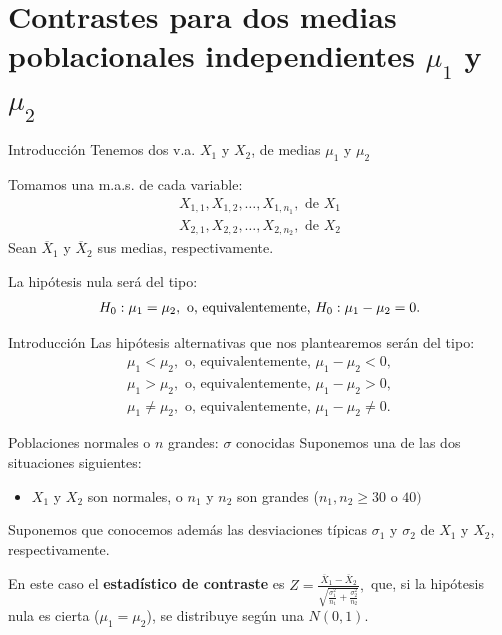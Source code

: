 \documentclass[
  ignorenonframetext,
]{beamer}
\providecommand{\tightlist}{%
  \setlength{\itemsep}{0pt}\setlength{\parskip}{0pt}}
\begin{document}
\hypertarget{contrastes-para-dos-medias-poblacionales-independientes-mu_1-y-mu_2}{%
\section{\texorpdfstring{Contrastes para dos medias poblacionales
independientes \(\mu_1\) y
\(\mu_2\)}{Contrastes para dos medias poblacionales independientes \textbackslash mu\_1 y \textbackslash mu\_2}}\label{contrastes-para-dos-medias-poblacionales-independientes-mu_1-y-mu_2}}

\begin{frame}{Introducción}
\protect\hypertarget{introducciuxf3n-1}{}
Tenemos dos v.a. \(X_1\) y \(X_2\), de medias \(\mu_1\) y \(\mu_2\)

Tomamos una m.a.s. de cada variable: \[
\begin{array}{l}
X_{1,1}, X_{1,2},\ldots, X_{1,n_1},\mbox{ de }X_1\\
X_{2,1}, X_{2,2},\ldots, X_{2,n_2},\mbox{ de }X_2
\end{array}
\] Sean \(\overline{X}_1\) y \(\overline{X}_2\) sus medias,
respectivamente.

La hipótesis nula será del tipo: \[
H_0: \mu_1  = \mu_2,\mbox{ o, equivalentemente, }H_0:\mu_1-\mu_2 = 0.\\
\]
\end{frame}

\begin{frame}{Introducción}
\protect\hypertarget{introducciuxf3n-2}{}
Las hipótesis alternativas que nos plantearemos serán del tipo: \[
\begin{array}{l}
\mu_1   <  \mu_2,\mbox{ o, equivalentemente, }\mu_1-\mu_2<0,\\
\mu_1  > \mu_2,\mbox{ o, equivalentemente, }\mu_1-\mu_2>0,\\
\mu_1  \neq \mu_2,\mbox{ o, equivalentemente, }\mu_1-\mu_2\neq 0.
\end{array}
\]
\end{frame}

\begin{frame}{Poblaciones normales o \(n\) grandes: \(\sigma\)
conocidas}
\protect\hypertarget{poblaciones-normales-o-n-grandes-sigma-conocidas}{}
Suponemos una de las dos situaciones siguientes:

\begin{itemize}[<+->]
\tightlist
\item
  \(X_1\) y \(X_2\) son normales, o \(n_1\) y \(n_2\) son grandes
  (\(n_1,n_2\geq 30\mbox{ o } 40)\)
\end{itemize}

Suponemos que conocemos además las desviaciones típicas \(\sigma_1\) y
\(\sigma_2\) de \(X_1\) y \(X_2\), respectivamente.

En este caso el \textbf{estadístico de contraste} es
\(Z=\frac{\overline{X}_1-\overline{X}_2}{\sqrt{\frac{\sigma_1^2}{n_1}+\frac{\sigma_2^2}{n_2}}},\)
que, si la hipótesis nula es cierta (\(\mu_1=\mu_2\)), se distribuye
según una \(N(0,1)\).
\end{frame}
\end{document}
